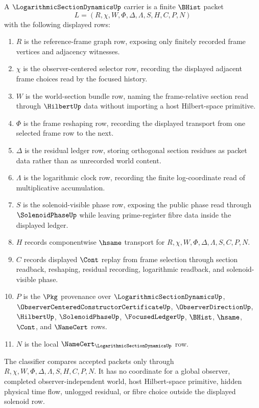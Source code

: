 \begin{definition}
\label{def:logarithmic-section-dynamics-carrier}
A $\LogarithmicSectionDynamicsUp$ carrier is a finite $\BHist$ packet
$$
L=(R,\chi,W,\Phi,\Delta,\Lambda,S,H,C,P,N)
$$
with the following displayed rows:
\begin{enumerate}
\item $R$ is the reference-frame graph row, exposing only finitely recorded frame vertices and adjacency witnesses.
\item $\chi$ is the observer-centered selector row, recording the displayed adjacent frame choices read by the focused history.
\item $W$ is the world-section bundle row, naming the frame-relative section read through $\HilbertUp$ data without importing a host Hilbert-space primitive.
\item $\Phi$ is the frame reshaping row, recording the displayed transport from one selected frame row to the next.
\item $\Delta$ is the residual ledger row, storing orthogonal section residues as packet data rather than as unrecorded world content.
\item $\Lambda$ is the logarithmic clock row, recording the finite log-coordinate read of multiplicative accumulation.
\item $S$ is the solenoid-visible phase row, exposing the public phase read through $\SolenoidPhaseUp$ while leaving prime-register fibre data inside the displayed ledger.
\item $H$ records componentwise $\hsame$ transport for $R,\chi,W,\Phi,\Delta,\Lambda,S,C,P,N$.
\item $C$ records displayed $\Cont$ replay from frame selection through section readback, reshaping, residual recording, logarithmic readback, and solenoid-visible phase.
\item $P$ is the $\Pkg$ provenance over $\LogarithmicSectionDynamicsUp$, $\ObserverCenteredConstructorCertificateUp$, $\ObserverDirectionUp$, $\HilbertUp$, $\SolenoidPhaseUp$, $\FocusedLedgerUp$, $\BHist$, $\hsame$, $\Cont$, and $\NameCert$ rows.
\item $N$ is the local $\NameCert_{\LogarithmicSectionDynamicsUp}$ row.
\end{enumerate}
The classifier compares accepted packets only through $R,\chi,W,\Phi,\Delta,\Lambda,S,H,C,P,N$. It has no coordinate for a global observer, completed observer-independent world, host Hilbert-space primitive, hidden physical time flow, unlogged residual, or fibre choice outside the displayed solenoid row.
\end{definition}

